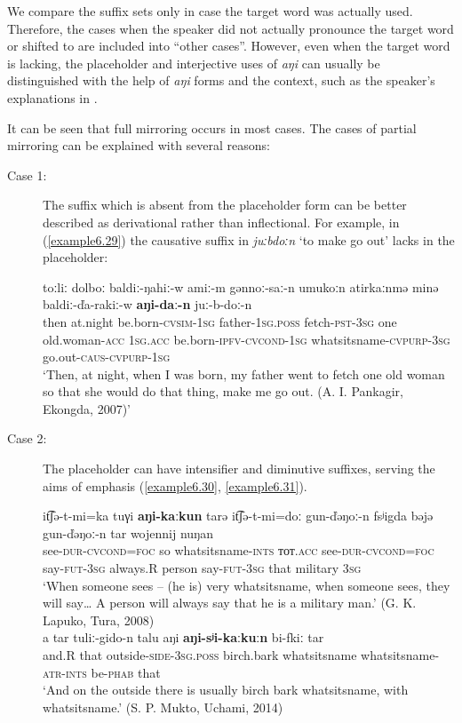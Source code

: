 \documentclass[output=paper,colorlinks,citecolor=brown]{langscibook}
\begin{document}
We compare the suffix sets only in case the  target word was actually used. Therefore, the cases when the speaker did not actually pronounce the target word or shifted to  are included into “other cases”. However, even when the target word is lacking, the placeholder and interjective uses of \textit{aŋi} can usually be distinguished with the help of \textit{aŋi} forms and the context, such as the speaker’s explanations in .

It can be seen that full mirroring occurs in most cases. The cases of partial mirroring can be explained with several reasons:

\begin{description}
  \item [Case 1:] The suffix which is absent from the placeholder form can be better described as derivational rather than inflectional. For example, in (\ref{example6.29}) the causative suffix in \textit{juːbdoːn} ‘to make go out’ lacks in the placeholder:

\ea
    \label{example6.29}
    \gll toːliː	dolboː	baldiː-ŋahiː-w 	amiː-m 	gənnoː-saː-n umukoːn	atirkaːnmə 	minə	baldiː-ďa-rakiː-w   \textbf{aŋi-daː-n}	juː-b-doː-n\\
    then	at.night	be.born-\textsc{cvsim}-1\textsc{sg}	father-1\textsc{sg.poss}	fetch-\textsc{pst}-3\textsc{sg} one	old.woman-\textsc{acc}	1\textsc{sg}.\textsc{acc}	be.born-\textsc{ipfv}-\textsc{cvcond}-1\textsc{sg} whatsitsname-\textsc{cvpurp}-3\textsc{sg}	go.out-\textsc{caus}-\textsc{cvpurp}-1\textsc{sg}\\
    \glt `Then, at night, when I was born, my father went to fetch one old woman so that she would do that thing, make me go out. (A. I. Pankagir, Ekongda, 2007)'\\
    \z

  \item [Case 2:] The placeholder can have intensifier and diminutive suffixes, serving the aims of emphasis (\ref{example6.30}, \ref{example6.31}).

\ea
    \label{example6.30}
    \gll it͡ʃə-t-mi=ka	tuγi	\textbf{aŋi-kaːkun}	tarə	it͡ʃə-t-mi=doː gun-ďəŋoː-n	fsʲigda	bəjə	gun-ďəŋoː-n tar	wojennij	nuŋan\\
    see-\textsc{dur}-\textsc{cvcond}=\textsc{foc}	so	whatsitsname-\textsc{ints}	тот.\textsc{acc} see-\textsc{dur}-\textsc{cvcond}=\textsc{foc} say-\textsc{fut}-3\textsc{sg}	always.R	person	say-\textsc{fut}-3\textsc{sg} that	military	3\textsc{sg}\\
    \glt `When someone sees – (he is) very whatsitsname, when someone sees, they will say… A person will always say that he is a military man.' (G. K. Lapuko, Tura, 2008)\\
    \ex
    \label{example6.31}
    \gll a	tar	tuliː-gido-n	talu	aŋi \textbf{aŋi-sʲi-kaːkuːn}	bi-fkiː	tar\\
    and.R	that	outside-\textsc{side}-\textsc{3sg.poss}	birch.bark	whatsitsname    whatsitsname-\textsc{atr}-\textsc{ints}	be-\textsc{phab}	that\\
    \glt `And on the outside there is usually birch bark whatsitsname, with whatsitsname.' (S. P. Mukto, Uchami, 2014)\\
    \z


\end{description}
\end{document}
